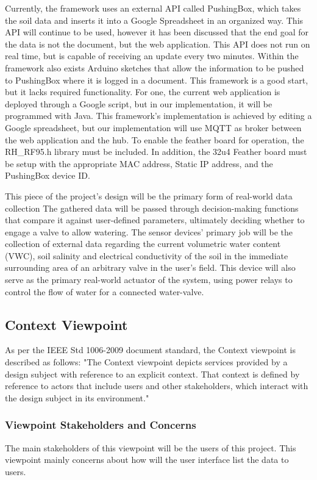 \documentclass[onecolumn, draftclsnofoot,10pt, compsoc]{IEEEtran}
\newcounter{subsubsubsection}[subsubsection]
\begin{document}
	Currently, the framework uses an external API called PushingBox, which takes the soil data and inserts it into a Google Spreadsheet in an organized way. 
	This API will continue to be used, however it has been discussed that the end goal for the data is not the document, but the web application. 
	This API does not run on real time, but is capable of receiving an update every two minutes. 
	Within the framework also exists Arduino sketches that allow the information to be pushed to PushingBox where it is logged in a document.
	This framework is a good start, but it lacks required functionality. 
	For one, the current web application is deployed through a Google script, but in our implementation, it will be programmed with Java. 
	This framework's implementation is achieved by editing a Google spreadsheet, but our implementation will use MQTT as broker between the web application and the hub.
	To enable the feather board for operation, the RH\_RF95.h library must be included. 
	In addition, the 32u4 Feather board must be setup with the appropriate MAC address, Static IP address, and the PushingBox device ID.
	
	This piece of the project's design will be the primary form of real-world data collection
	The gathered data will be passed through decision-making functions that compare it against user-defined parameters, ultimately deciding whether to engage a valve to allow watering.
	The sensor devices' primary job will be the collection of external data regarding the current volumetric water content (VWC), soil salinity and electrical conductivity of the soil in the immediate surrounding area of an arbitrary valve in the user's field.
	This device will also serve as the primary real-world actuator of the system, using power relays to control the flow of water for a connected water-valve.
	
	\subsection{Context Viewpoint}
	As per the IEEE Std 1006-2009 document standard, the Context viewpoint is described as follows: "The Context viewpoint depicts services provided by a design subject with reference to an explicit context. That context is defined by reference to actors that include users and other stakeholders, which interact with the  design  subject  in  its  environment."    
	\subsubsection{Viewpoint Stakeholders and Concerns}
	The main stakeholders of this viewpoint will be the users of this project. This viewpoint mainly concerns about how will the user interface list the data to users.
\end{document}
